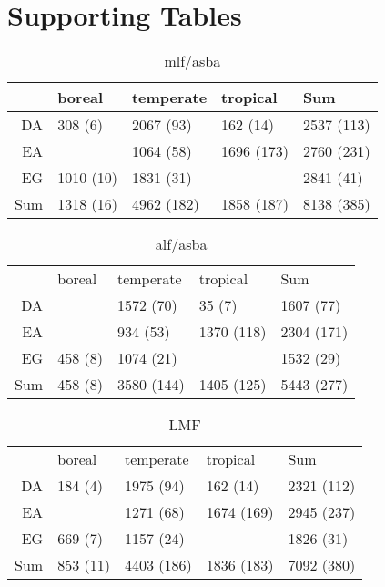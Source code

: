 \documentclass[a4paper]{article}\usepackage[]{graphicx}\usepackage[]{color}
\begin{document}
\clearpage
\section{Supporting Tables}

\begin{table}[ht]
\centering
\caption{mlf/asba} 
\begin{tabular}{rlll|l}
  & boreal & temperate & tropical & Sum \\ 
  \hline
DA & 308 (6) & 2067 (93) & 162 (14) & 2537 (113) \\ 
  EA &  & 1064 (58) & 1696 (173) & 2760 (231) \\ 
  EG & 1010 (10) & 1831 (31) &  & 2841 (41) \\ 
   \hline
Sum & 1318 (16) & 4962 (182) & 1858 (187) & 8138 (385) \\ 
  \end{tabular}
\end{table}



\begin{table}[ht]
\centering
\caption{alf/asba} 
\begin{tabular}{rlll|l}
  & boreal & temperate & tropical & Sum \\ 
 DA &  & 1572 (70) & 35 (7) & 1607 (77) \\ 
   \hline
EA &  & 934 (53) & 1370 (118) & 2304 (171) \\ 
  EG & 458 (8) & 1074 (21) &  & 1532 (29) \\ 
   \hline
Sum & 458 (8) & 3580 (144) & 1405 (125) & 5443 (277) \\ 
  \end{tabular}
\end{table}



\begin{table}[ht]
\centering
\caption{LMF} 
\begin{tabular}{rlll|l}
  & boreal & temperate & tropical & Sum \\ 
 DA & 184 (4) & 1975 (94) & 162 (14) & 2321 (112) \\ 
   \hline
EA &  & 1271 (68) & 1674 (169) & 2945 (237) \\ 
  EG & 669 (7) & 1157 (24) &  & 1826 (31) \\ 
   \hline
Sum & 853 (11) & 4403 (186) & 1836 (183) & 7092 (380) \\ 
  \end{tabular}
\end{table}
\end{document}

